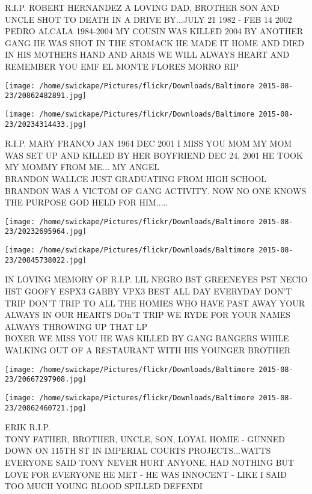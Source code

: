 \documentclass[10pt,letterpaper]{article}
\begin{document}
R.I.P. ROBERT HERNANDEZ A LOVING DAD, BROTHER SON AND UNCLE SHOT TO DEATH IN A DRIVE BY...JULY 21 1982 {-} FEB 14 2002\\
PEDRO ALCALA 1984{-}2004 MY COUSIN WAS KILLED 2004 BY ANOTHER GANG HE WAS SHOT IN THE STOMACK HE MADE IT HOME AND DIED IN HIS MOTHERS HAND AND ARMS WE WILL ALWAYS HEART AND REMEMBER YOU EMF EL MONTE FLORES MORRO RIP
\pagebreak

\texttt{[image: /home/swickape/Pictures/flickr/Downloads/Baltimore 2015-08-23/20862482891.jpg]}

\vspace{0.25in}
\texttt{[image: /home/swickape/Pictures/flickr/Downloads/Baltimore 2015-08-23/20234314433.jpg]}

R.I.P. MARY FRANCO JAN 1964 DEC 2001 I MISS YOU MOM MY MOM WAS SET UP AND KILLED BY HER BOYFRIEND DEC 24, 2001 HE TOOK MY MOMMY FROM ME... MY ANGEL\\
BRANDON WALLCE JUST GRADUATING FROM HIGH SCHOOL BRANDON WAS A VICTOM OF GANG ACTIVITY.  NOW NO ONE KNOWS THE PURPOSE GOD HELD FOR HIM.....
\pagebreak

\texttt{[image: /home/swickape/Pictures/flickr/Downloads/Baltimore 2015-08-23/20232695964.jpg]}

\vspace{0.25in}
\texttt{[image: /home/swickape/Pictures/flickr/Downloads/Baltimore 2015-08-23/20845738022.jpg]}

IN LOVING MEMORY OF R.I.P. LIL NEGRO BST GREENEYES PST NECIO HST GOOFY ESPX3 GABBY VPX3 BEST ALL DAY EVERYDAY DON'T TRIP DON'T TRIP TO ALL THE HOMIES WHO HAVE PAST AWAY YOUR ALWAYS IN OUR HEARTS DOn'T TRIP WE RYDE FOR YOUR NAMES ALWAYS THROWING UP THAT LP\\
BOXER WE MISS YOU HE WAS KILLED BY GANG BANGERS WHILE WALKING OUT OF A RESTAURANT WITH HIS YOUNGER BROTHER
\pagebreak

\texttt{[image: /home/swickape/Pictures/flickr/Downloads/Baltimore 2015-08-23/20667297908.jpg]}

\vspace{0.25in}
\texttt{[image: /home/swickape/Pictures/flickr/Downloads/Baltimore 2015-08-23/20862460721.jpg]}

ERIK R.I.P.\\
TONY FATHER, BROTHER, UNCLE, SON, LOYAL HOMIE {-} GUNNED DOWN ON 115TH ST IN IMPERIAL COURTS PROJECTS...WATTS EVERYONE SAID TONY NEVER HURT ANYONE, HAD NOTHING BUT LOVE FOR EVERYONE HE MET {-} HE WAS INNOCENT {-} LIKE I SAID TOO MUCH YOUNG BLOOD SPILLED DEFENDI
\pagebreak
\end{document}
